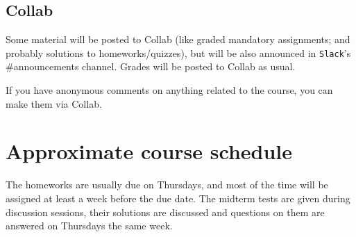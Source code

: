 \documentclass[oneside,11pt]{amsart}
\begin{document}
\subsection{Collab}

Some material will be posted to Collab (like graded mandatory assignments; and probably solutions to homeworks/quizzes), but will be also announced in \texttt{Slack}'s \#announcements channel. Grades will be posted to Collab as usual.

If you have anonymous comments on anything related to the course, you can make them via Collab.

\section{Approximate course schedule}

The homeworks are usually due on Thursdays, and most of the time will be assigned at least a week before the due date. The midterm tests are given during discussion sessions, their solutions are discussed and questions on them are answered on Thursdays the same week.

\vspace{5pt}
\end{document}
